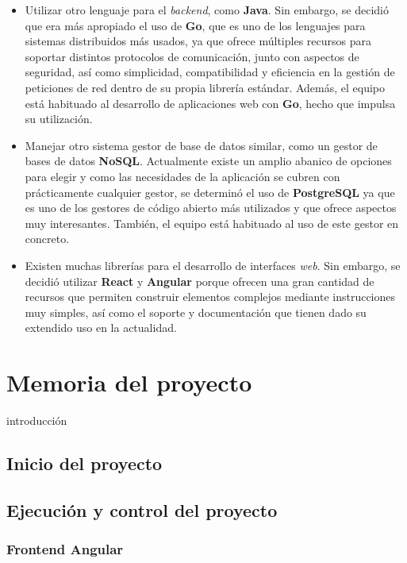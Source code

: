 \documentclass[11pt, a4paper, titlepage]{article}
\begin{document}
\begin{itemize}
    \item Utilizar otro lenguaje para el \textit{backend}, como \textbf{Java}. Sin embargo, se decidió que era más apropiado el uso de \textbf{Go}, que es uno de los lenguajes para sistemas distribuidos más usados, ya que ofrece múltiples recursos para soportar distintos protocolos de comunicación, junto con aspectos de seguridad, así como simplicidad, compatibilidad y eficiencia en la gestión de peticiones de red dentro de su propia librería estándar. Además, el equipo está habituado al desarrollo de aplicaciones web con \textbf{Go}, hecho que impulsa su utilización.
    
    \item  Manejar otro sistema gestor de base de datos similar, como un gestor de bases de datos \textbf{NoSQL}. Actualmente existe un amplio abanico de opciones para elegir y como las necesidades de la aplicación se cubren con prácticamente cualquier gestor, se determinó el uso de  \textbf{PostgreSQL} ya que es uno de los gestores de código abierto más utilizados y que ofrece aspectos muy interesantes. También, el equipo está habituado al uso de este gestor en concreto.
    
    \item Existen muchas librerías para el desarrollo de interfaces \textit{web}. Sin embargo, se decidió utilizar  \textbf{React} y \textbf{Angular} porque ofrecen una gran cantidad de recursos que permiten construir elementos complejos mediante instrucciones muy simples, así como el soporte y documentación que tienen dado su extendido uso en la actualidad.
\end{itemize}


\section{Memoria del proyecto}
introducción

\subsection{Inicio del proyecto}

\subsection{Ejecución y control del proyecto}

\subsubsection{Frontend Angular}
\end{document}
